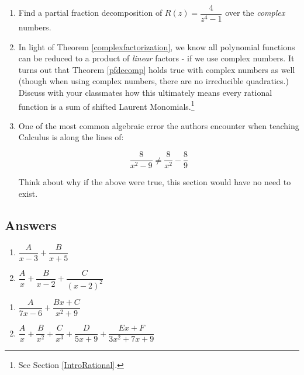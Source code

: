 \begin{enumerate}
\setcounter{enumi}{\value{HW}}

\item  Find a partial fraction decomposition of $R(z) = \dfrac{4}{z^4-1}$ over the \textit{complex} numbers.  

\item  In light of Theorem \ref{complexfactorization}, we know all polynomial functions can be reduced to a product of \textit{linear} factors - if we use complex numbers.  It turns out that Theorem \ref{pfdecomp} holds true with complex numbers as well (though when using complex numbers, there are no irreducible quadratics.)  Discuss with your classmates how this ultimately means every rational function is a sum of shifted Laurent Monomials.\footnote{See Section \ref{IntroRational}.}

\item  One of the most common algebraic error the authors encounter when teaching  Calculus is along the lines of:

\[ \dfrac{8}{x^2 - 9} \neq \dfrac{8}{x^2} - \dfrac{8}{9}\]

Think about  why if the above were true, this section would have no need to exist.

\end{enumerate}

\newpage

\subsection{Answers}

\begin{multicols}{2}
\begin{enumerate}

\item $\dfrac{A}{x - 3} + \dfrac{B}{x + 5}$
\item $\dfrac{A}{x} + \dfrac{B}{x - 2} + \dfrac{C}{(x - 2)^{2}}$

\setcounter{HW}{\value{enumi}}
\end{enumerate}
\end{multicols}

\begin{multicols}{2}
\begin{enumerate}
\setcounter{enumi}{\value{HW}}

\item $\dfrac{A}{7x - 6} + \dfrac{Bx + C}{x^{2} + 9}$
\item $\dfrac{A}{x} + \dfrac{B}{x^{2}} + \dfrac{C}{x^{3}} + \dfrac{D}{5x + 9} + \dfrac{Ex + F}{3x^{2} + 7x + 9}$

\setcounter{HW}{\value{enumi}}
\end{enumerate}
\end{multicols}

